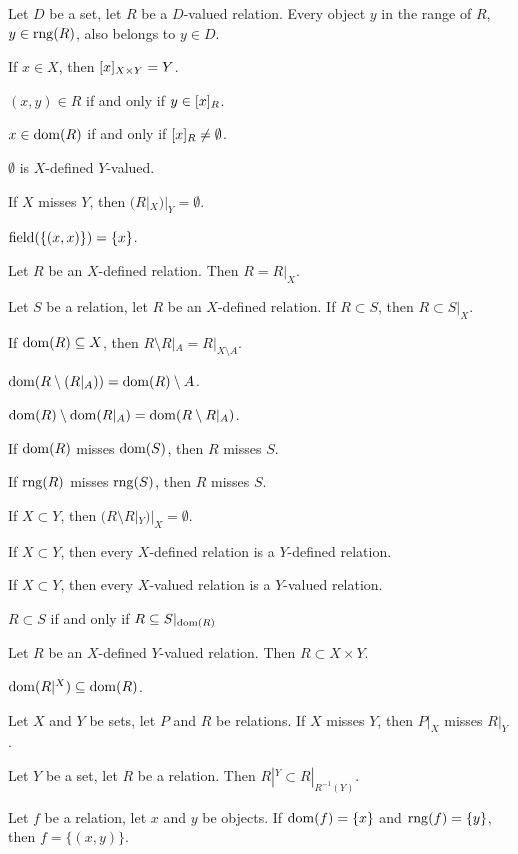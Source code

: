 \documentclass{article}
\begin{document}
\begin{thm}
\item\label{relat1:167} Let $D$ be a set, let $R$ be a $D$-valued relation.
  Every object $y$ in the range of $R$, $y\in\rng(R)$, also belongs to
  $y\in D$.
\item\label{relat1:168} If $x\in X$, then $\RelIm{X\times Y}{x}=Y$.
\item\label{relat1:169} $(x,y)\in R$ if and only if $y\in\RelIm{R}{x}$. 
\item\label{relat1:170} $x\in\dom(R)$ if and only if $\RelIm{R}{x}\neq\emptyset$.
\item\label{relat1:171} $\emptyset$ is $X$-defined $Y$-valued.
\item\label{relat1:172} If $X$ misses $Y$, then $(R|_{X})|_{Y}=\emptyset$.
\item\label{relat1:173} $\field(\{(x,x)\})=\{x\}$.
\item\label{relat1:174} Let $R$ be an $X$-defined relation. Then $R=R|_{X}$.
\item\label{relat1:175} Let $S$ be a relation, let $R$ be an $X$-defined relation.
  If $R\subset S$, then $R\subset S|_{X}$.
\item\label{relat1:176} If $\dom(R)\subset X$, then $R\setminus R|_{A}=R|_{X\setminus A}$.
\item\label{relat1:177} $\dom(R\setminus(R|_{A}))=\dom(R)\setminus A$.
\item\label{relat1:178} $\dom(R)\setminus\dom(R|_{A})=\dom(R\setminus R|_{A})$.
\item\label{relat1:179} If $\dom(R)$ misses $\dom(S)$,
  then $R$ misses $S$.
\item\label{relat1:180} If $\rng(R)$ misses $\rng(S)$,
  then $R$ misses $S$.
\item\label{relat1:181} If $X\subset Y$, then $(R\setminus R|_{Y})|_{X}=\emptyset$.
\item\label{relat1:182} If $X\subset Y$,
  then every $X$-defined relation is a $Y$-defined relation.
\item\label{relat1:183} If $X\subset Y$,
  then every $X$-valued relation is a $Y$-valued relation.
\item\label{relat1:184} $R\subset S$ if and only if $R\subset S|_{\dom(R)}$
\item\label{relat1:185} Let $R$ be an $X$-defined $Y$-valued relation.
  Then $R\subset X\times Y$.
\item\label{relat1:186} $\dom(R|^{X})\subset\dom(R)$.
\item\label{relat1:187} Let $X$ and $Y$ be sets, let $P$ and $R$ be
  relations.
  If $X$ misses $Y$, then $P|_{X}$ misses $R|_{Y}$.
\item\label{relat1:188} Let $Y$ be a set, let $R$ be a relation. Then
  $R|^{Y}\subset R|_{R^{-1}(Y)}$.
\item\label{relat1:189} Let $f$ be a relation, let $x$ and $y$ be objects.
  If $\dom(f)=\{x\}$ and $\rng(f)=\{y\}$, then $f=\{(x,y)\}$.
\end{thm}
\end{document}
